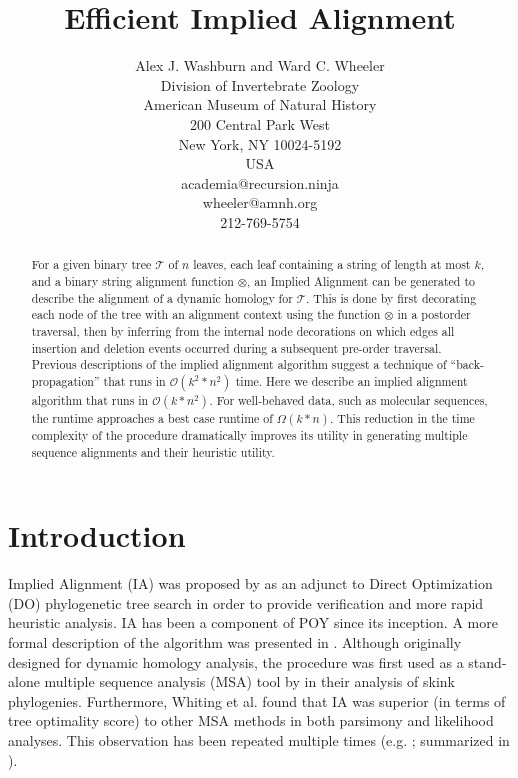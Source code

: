 \documentclass[11pt]{article}
\title{ \textbf{Efficient Implied Alignment}}
\author{Alex J. Washburn and Ward C. Wheeler\\
		Division of  Invertebrate Zoology\\
		American Museum of Natural History\\
		200 Central Park West\\
		New York, NY 10024-5192\\
		USA\\
		academia@recursion.ninja\\
		wheeler@amnh.org\\
		212-769-5754}
\begin{document}
\maketitle
\begin{abstract}
For a given binary tree $\mathcal{T}$ of $n$ leaves, each leaf containing a string of length at most $k$, and a binary string alignment function $\otimes$, an Implied Alignment can be generated to describe the alignment of a dynamic homology for $\mathcal{T}$.
This is done by first decorating each node of the tree with an alignment context using the function $\otimes$ in a postorder traversal, then by inferring from the internal node decorations on which edges all insertion and deletion events occurred during a subsequent pre-order traversal.
Previous descriptions of the implied alignment algorithm suggest a technique of ``back-propagation'' that runs in $\mathcal{O}(k^2 * n^2)$ time.
Here we describe an implied alignment algorithm that runs in \textsc{$\mathcal{O}(k * n^2)$}.
For well-behaved data, such as molecular sequences, the runtime approaches a best case runtime of \textsc{$\Omega(k * n)$}.
This reduction in the time complexity of the procedure dramatically improves its utility in generating multiple sequence alignments and their heuristic utility.
\end{abstract}
\newpage
\tableofcontents
\newpage


\section{Introduction}
Implied Alignment (IA) was proposed by \cite{Wheeler2003} as an adjunct to Direct Optimization (DO) \citep{Wheeler1996,VaronandWheeler2012} phylogenetic tree search in order to provide verification and more rapid heuristic analysis.
IA has been a component of POY \citep{Wheeleretal2015, POY5} since its inception.
A more formal description of the algorithm was presented in \cite{Wheeleretal2006}.
Although originally designed for dynamic homology \citep{Wheeler2001} analysis, the procedure was first used as a stand-alone multiple sequence analysis (MSA) tool by \cite{WhitingAetal2006} in their analysis of skink phylogenies. 
Furthermore, Whiting et al. found that IA was superior (in terms of tree optimality score) to other MSA methods in both parsimony and likelihood analyses.
This observation has been repeated multiple times (e.g. \citealp{LindgrenandDaly2007, FordandWheeler2015}; summarized in \citealp{Wheeler2012}).
\end{document}

